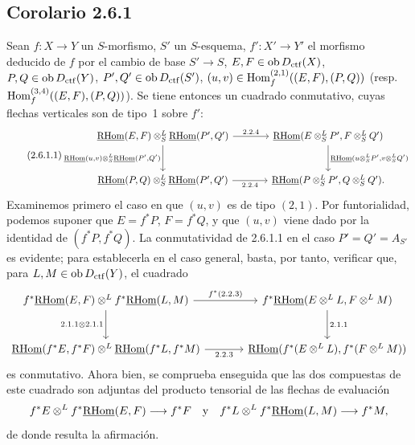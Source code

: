 \subsection*{Corolario 2.6.1}
Sean $f:X\to Y$ un $S$-morfismo, $S'$ un $S$-esquema, $f':X'\to Y'$ el morfismo deducido de $f$ por el cambio de base $S'\to S$, $E,F\in\operatorname{ob} D_{\mathrm{ctf}}(X)$, $P,Q\in\operatorname{ob} D_{\mathrm{ctf}}(Y)$, $P',Q'\in\operatorname{ob} D_{\mathrm{ctf}}(S')$, $(u,v)\in\operatorname{Hom}_f^{(2,1)}((E,F),(P,Q))$ (resp. $\operatorname{Hom}_f^{(3,4)}((E,F),(P,Q))$). Se tiene entonces un cuadrado conmutativo, cuyas flechas verticales son de tipo~1 sobre $f'$:
\begin{equation}\tag{2.6.1.1}
\begin{tikzcd}[column sep=large,row sep=large]
\uRHom(E,F)\otimes^L_S\uRHom(P',Q') \arrow[r,"2.2.4"] \arrow[d,"{\uRHom(u,v)\otimes^L_S\uRHom(P',Q')}"'] & \uRHom(E\otimes^L_SP',F\otimes^L_SQ') \arrow[d,"{\uRHom(u\otimes^L_SP',v\otimes^L_SQ')}"]\\
\uRHom(P,Q)\otimes^L_S\uRHom(P',Q') \arrow[r,"2.2.4"'] & \uRHom(P\otimes^L_SP',Q\otimes^L_SQ').
\end{tikzcd}
\end{equation}
Examinemos primero el caso en que $(u,v)$ es de tipo $(2,1)$. Por funtorialidad, podemos suponer que $E=f^{*}P$, $F=f^{*}Q$, y que $(u,v)$ viene dado por la identidad de $(f^{*}P,f^{*}Q)$. La conmutatividad de 2.6.1.1 en el caso $P'=Q'=A_{S'}$ es evidente; para establecerla en el caso general, basta, por tanto, verificar que, para $L,M\in\operatorname{ob} D_{\mathrm{ctf}}(Y)$, el cuadrado
\[
\begin{tikzcd}[column sep=large,row sep=large]
f^{*}\uRHom(E,F)\otimes^L f^{*}\uRHom(L,M) \arrow[r,"{f^*(2.2.3)}"] \arrow[d,"{2.1.1\otimes 2.1.1}"'] & f^{*}\uRHom(E\otimes^LL,F\otimes^LM) \arrow[d,"2.1.1"]\\
\uRHom(f^{*}E,f^{*}F)\otimes^L\uRHom(f^{*}L,f^{*}M) \arrow[r,"2.2.3"'] & \uRHom(f^{*}(E\otimes^LL),f^{*}(F\otimes^LM))
\end{tikzcd}
\]
es conmutativo. Ahora bien, se comprueba enseguida que las dos compuestas de este cuadrado son adjuntas del producto tensorial de las flechas de evaluación
\[
f^{*}E\otimes^L f^{*}\underline{\mathrm{RHom}}(E,F)\longrightarrow f^{*}F
\quad\text{y}\quad
f^{*}L\otimes^L f^{*}\underline{\mathrm{RHom}}(L,M)\longrightarrow f^{*}M,
\]
de donde resulta la afirmación.

